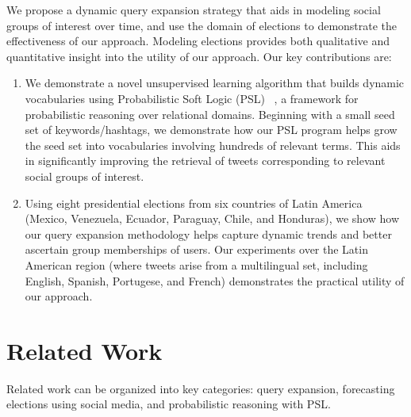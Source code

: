 We propose a dynamic query expansion strategy that aids in modeling social groups of interest over time, and
use the domain of elections to demonstrate the effectiveness of our approach. Modeling elections provides both
qualitative and quantitative insight into the utility of our approach.
Our key contributions are:
\begin{enumerate}
\item We demonstrate
a novel unsupervised learning algorithm that builds dynamic vocabularies using Probabilistic Soft Logic (PSL) ~\cite{kimmig2012short}, a framework for probabilistic reasoning over relational domains.
Beginning with a small seed set of keywords/hashtags, we demonstrate how our PSL program helps
grow the seed set into 
vocabularies involving hundreds of relevant terms. This aids in significantly improving the retrieval of tweets
corresponding to relevant
social groups of interest.
\item Using eight presidential elections from six countries of Latin America (Mexico, Venezuela, Ecuador, Paraguay, Chile, and Honduras), we show how our query expansion methodology helps capture dynamic trends and
better ascertain group memberships of users. Our %
experiments over the Latin American region (where tweets
arise from a multilingual set, including English, Spanish, Portugese, and French) demonstrates the practical utility
of our approach.
\begin{comment}
\item In addition to qualitative understanding of social groups, we demonstrate how our approach yields
appreciable improvements to the forecasting of election outcomes. By regressing against opinion polls in each region,
we illustrate how better social group modeling reveals popularities of candidates and their policies.
\end{comment}
\end{enumerate}

\section{Related Work}
Related work can be organized into key categories: query expansion, forecasting elections using social media,
and probabilistic reasoning with PSL.

